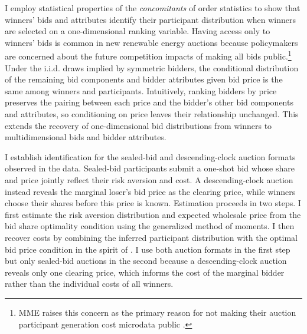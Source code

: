 \documentclass[12pt]{article}
\theoremstyle{definition} %
\begin{document}
I employ statistical properties of the \textit{concomitants} of order statistics \citep{Yang1977} to show that winners' bids and attributes identify their participant distribution when winners are selected on a one-dimensional ranking variable. Having access only to winners' bids is common in new renewable energy auctions because policymakers are concerned about the future competition impacts of making all bids public.\footnote{
MME raises this concern as the primary reason for not making their auction participant generation cost microdata public \citep{EPE2022b}.
}
Under the i.i.d. draws implied by symmetric bidders, the conditional distribution of the remaining bid components and bidder attributes given bid price is the same among winners and participants. Intuitively, ranking bidders by price preserves the pairing between each price and the bidder's other bid components and attributes, so conditioning on price leaves their relationship unchanged. This extends the recovery of one-dimensional bid distributions from winners \citep{Athey2002} to multidimensional bids and bidder attributes.

I establish identification for the sealed-bid and descending-clock auction formats observed in the data. Sealed-bid participants submit a one-shot bid whose share and price jointly reflect their risk aversion and cost. A descending-clock auction instead reveals the marginal loser's bid price as the clearing price, while winners choose their shares before this price is known. Estimation proceeds in two steps. I first estimate the risk aversion distribution and expected wholesale price from the bid share optimality condition using the generalized method of moments. I then recover costs by combining the inferred participant distribution with the optimal bid price condition in the spirit of \citet*{Guerre2000}. I use both auction formats in the first step but only sealed-bid auctions in the second because a descending-clock auction reveals only one clearing price, which informs the cost of the marginal bidder rather than the individual costs of all winners.
\end{document}
